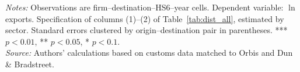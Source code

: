 \documentclass[11pt,a4paper]{article}
\begin{document}
\begin{table}[H]\centering\small%
  \caption{Distance and Firm Exports, by Sector}%
  \label{tab:f6sum}%
  \par\vspace{3pt}%
  \begin{minipage}{0.95\textwidth}\footnotesize %
  \textit{Notes:} Observations are firm--destination--HS6--year cells. Dependent variable: $\ln$ exports. Specification of columns (1)--(2) of Table~\ref{tab:dist_all}, estimated by sector. Standard errors clustered by origin--destination pair in parentheses. *** $p<0.01$, ** $p<0.05$, * $p<0.1$.\\[3pt]%
  \textit{Source:} Authors' calculations based on customs data matched to Orbis and Dun \& Bradstreet.%
  \end{minipage}%
  \end{table}
\end{document}
